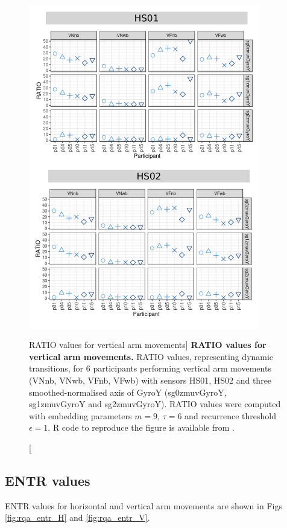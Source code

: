 \begin{figure}
\centering
\includegraphics[width=0.9\textwidth]{rqa_ratio_V_w500}
    \caption
	[RATIO values for vertical arm movements]{
	{\bf RATIO values for vertical arm movements.}	
	RATIO values, representing dynamic transitions, 
	for 6 participants performing vertical arm movements 
	(VNnb, VNwb, VFnb, VFwb)
	with sensors HS01, HS02 and three smoothed-normalised axis 
	of GyroY (sg0zmuvGyroY, sg1zmuvGyroY and sg2zmuvGyroY).
	RATIO values were computed with 
	embedding parameters $m=9$, $\tau=6$ and recurrence threshold
	$\epsilon=1$.
	R code to reproduce the figure is available from \cite{xochicale2018}.
        }
    \label{fig:rqa_ratio_V}
\end{figure}



\newpage
\subsection{ENTR values}
ENTR values for horizontal and vertical arm movements are shown 
in Figs \ref{fig:rqa_entr_H} and \ref{fig:rqa_entr_V}.

